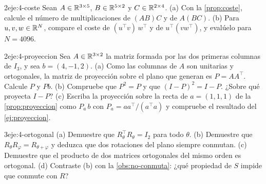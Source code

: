 \begin{ejercicio}{2}{eje:4-coste}
Sean $A\in\mathbb{R}^{3\times 5}$, $B\in\mathbb{R}^{5\times 2}$ y $C\in\mathbb{R}^{2\times 4}$. (a) Con la \cref{prop:coste}, calcule el número de multiplicaciones de $(AB)C$ y de $A(BC)$. (b) Para $u,v,w\in\mathbb{R}^{N}$, compare el coste de $(u^{\top}v)\,w^{\top}$ y de $u^{\top}(vw^{\top})$, y evalúelo para $N=4096$.
\end{ejercicio}

\begin{ejercicio}{2}{eje:4-proyeccion}
Sea $A\in\mathbb{R}^{3\times 2}$ la matriz formada por las dos primeras columnas de $I_3$, y sea $b=(4,-1,2)$. (a) Como las columnas de $A$ son unitarias y ortogonales, la matriz de proyección sobre el plano que generan es $P=AA^{\top}$. Calcule $P$ y $Pb$. (b) Compruebe que $P^{2}=P$ y que $(I-P)^{2}=I-P$. ¿Sobre qué proyecta $I-P$? (c) Escriba la proyección sobre la recta de $a=(1,1,1)$ de la \cref{prop:proyeccion} como $P_a\,b$ con $P_a=aa^{\top}/(a^{\top}a)$ y compruebe el resultado del \cref{ej:proyeccion}.
\end{ejercicio}

\begin{ejercicio}{3}{eje:4-ortogonal}
(a) Demuestre que $R_\theta^{\top}R_\theta=I_2$ para todo $\theta$. (b) Demuestre que $R_\theta R_\varphi=R_{\theta+\varphi}$ y deduzca que dos rotaciones del plano siempre conmutan. (c) Demuestre que el producto de dos matrices ortogonales del mismo orden es ortogonal. (d) Contraste (b) con la \cref{obs:no-conmuta}: ¿qué propiedad de $S$ impide que conmute con $R$?
\end{ejercicio}
